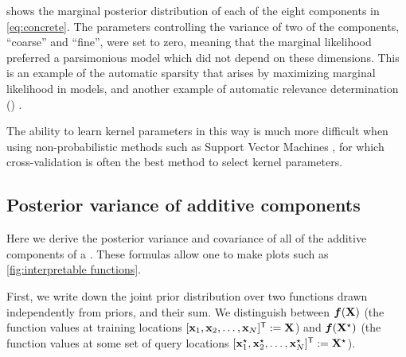  shows the marginal posterior distribution of each of the eight components in \cref{eq:concrete}.
The parameters controlling the variance of two of the components, ``coarse'' and ``fine'', were set to zero, meaning that the marginal likelihood preferred a parsimonious model which did not depend on these dimensions.
This is an example of the automatic sparsity that arises by maximizing marginal likelihood in \gp{} models, and another example of automatic relevance determination (\ARD) \citep{neal1995bayesian}.

The ability to learn kernel parameters in this way is much more difficult when using non-probabilistic methods such as Support Vector Machines \citep{cortes1995support}, for which cross-validation is often the best method to select kernel parameters.



\subsection{Posterior variance of additive components}
\label{sec:posterior-variance}


Here we derive the posterior variance and covariance of all of the additive components of a \gp{}.
These formulas allow one to make plots such as \cref{fig:interpretable functions}.

First, we write down the joint prior distribution over two functions drawn independently from \gp{} priors, and their sum.
We distinguish between $\boldsymbol{f}(\mathbf{X})$ (the function values at training locations $[{\bf{x}}_1, {\bf{x}}_2, \ldots, {\bf{x}}_N]^{\mathsf{T}} \mathrel{:\mkern-0.25mu=} \mathbf{X}$) and  $\boldsymbol{f}(\mathbf{X}^\star)$ (the function values at some set of query locations $[{\bf{x}}_1^\star, {\bf{x}}_2^\star, \ldots, {\bf{x}}_N^\star]^{\mathsf{T}} \mathrel{:\mkern-0.25mu=} \mathbf{X}^\star$).

